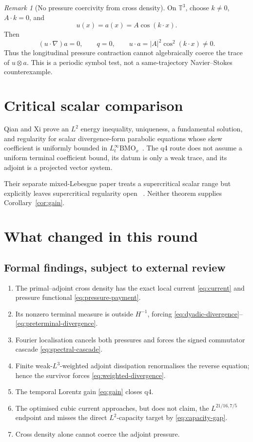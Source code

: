 \documentclass[11pt]{article}
\theoremstyle{remark}
\newtheorem{remark}[theorem]{Remark}
\begin{document}
\begin{remark}[No pressure coercivity from cross density]
On \(\mathbb T^3\), choose \(k\neq0\), \(A\cdot k=0\), and
\[
 u(x)=a(x)=A\cos(k\cdot x).
\]
Then
\[
 (u\cdot\nabla)a=0,\qquad q=0,
 \qquad u\cdot a=|A|^2\cos^2(k\cdot x)\neq0.
\]
Thus the longitudinal pressure contraction cannot algebraically
coerce the trace of \(u\otimes a\).  This is a periodic symbol test,
not a same-trajectory Navier--Stokes counterexample.
\end{remark}

\section{Critical scalar comparison}

Qian and Xi prove an \(L^2\) energy inequality, uniqueness, a
fundamental solution, and regularity for scalar divergence-form
parabolic equations whose skew coefficient is uniformly bounded in
\(L^\infty_t\mathrm{BMO}_x\)~\cite{QXBMO}.  The q4 route does not
assume a uniform terminal coefficient bound, its datum is only a weak
trace, and its adjoint is a projected vector system.

Their separate mixed-Lebesgue paper treats a supercritical scalar
range but explicitly leaves supercritical regularity open
~\cite{QXMixed}.  Neither theorem supplies
Corollary~\ref{cor:gain}.

\section{What changed in this round}

\subsection*{Formal findings, subject to external review}

\begin{enumerate}
\item The primal--adjoint cross density has the exact local current
\eqref{eq:current} and pressure functional
\eqref{eq:pressure-payment}.
\item Its nonzero terminal measure is outside \(H^{-1}\), forcing
\eqref{eq:dyadic-divergence}--\eqref{eq:preterminal-divergence}.
\item Fourier localisation cancels both pressures and forces the signed
commutator cascade \eqref{eq:spectral-cascade}.
\item Finite weak-\(L^3\)-weighted adjoint dissipation renormalises the
reverse equation; hence the survivor forces
\eqref{eq:weighted-divergence}.
\item The temporal Lorentz gain \eqref{eq:gain} closes q4.
\item The optimised cubic current approaches, but does not claim, the
\(L^{21/16,7/5}\) endpoint and misses the direct \(L^2\)-capacity
target by \eqref{eq:capacity-gap}.
\item Cross density alone cannot coerce the adjoint pressure.
\end{enumerate}
\end{document}
